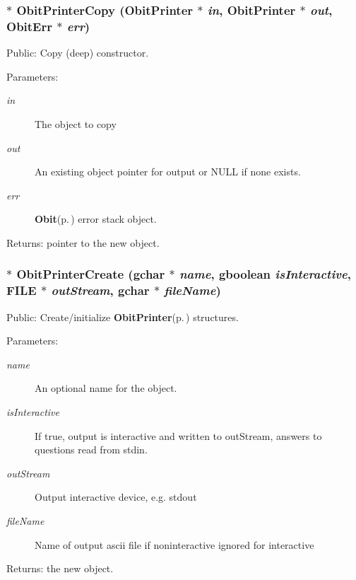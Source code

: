 \subsubsection{$\ast$ Obit\-Printer\-Copy ({\bf Obit\-Printer} $\ast$ {\em in}, {\bf Obit\-Printer} $\ast$ {\em out}, {\bf Obit\-Err} $\ast$ {\em err})}\label{ObitPrinter_8h_a13}


Public: Copy (deep) constructor. 

\begin{Desc}
\item[Parameters:]
\begin{description}
\item[{\em in}]The object to copy \item[{\em out}]An existing object pointer for output or NULL if none exists. \item[{\em err}]{\bf Obit}{\rm (p.\,\pageref{structObit})} error stack object. \end{description}
\end{Desc}
\begin{Desc}
\item[Returns:]pointer to the new object. \end{Desc}
\subsubsection{$\ast$ Obit\-Printer\-Create (gchar $\ast$ {\em name}, gboolean {\em is\-Interactive}, FILE $\ast$ {\em out\-Stream}, gchar $\ast$ {\em file\-Name})}\label{ObitPrinter_8h_a11}


Public: Create/initialize {\bf Obit\-Printer}{\rm (p.\,\pageref{structObitPrinter})} structures. 

\begin{Desc}
\item[Parameters:]
\begin{description}
\item[{\em name}]An optional name for the object. \item[{\em is\-Interactive}]If true, output is interactive and written to out\-Stream, answers to questions read from stdin. \item[{\em out\-Stream}]Output interactive device, e.g. stdout \item[{\em file\-Name}]Name of output ascii file if noninteractive ignored for interactive \end{description}
\end{Desc}
\begin{Desc}
\item[Returns:]the new object. \end{Desc}
